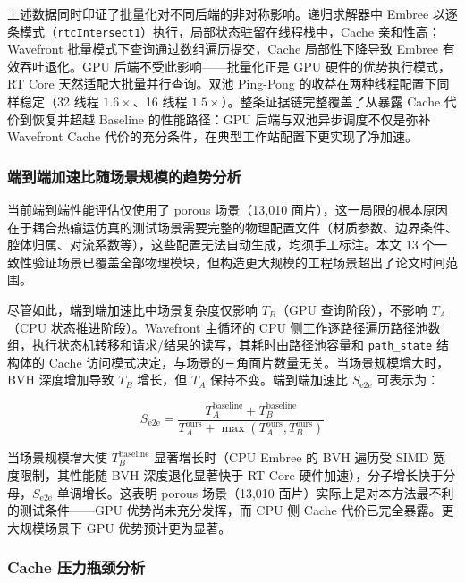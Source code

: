上述数据同时印证了批量化对不同后端的非对称影响。递归求解器中 Embree 以逐条模式（\texttt{rtcIntersect1}）执行，局部状态驻留在线程栈中，Cache 亲和性高；Wavefront 批量模式下查询通过数组遍历提交，Cache 局部性下降导致 Embree 有效吞吐退化。GPU 后端不受此影响——批量化正是 GPU 硬件的优势执行模式，RT Core 天然适配大批量并行查询。双池 Ping-Pong 的收益在两种线程配置下同样稳定（32 线程 $1.6\times$、16 线程 $1.5\times$）。整条证据链完整覆盖了从暴露 Cache 代价到恢复并超越 Baseline 的性能路径：GPU 后端与双池异步调度不仅是弥补 Wavefront Cache 代价的充分条件，在典型工作站配置下更实现了净加速。

\subsubsection{端到端加速比随场景规模的趋势分析}
\label{sec:scene-scale-analysis}

当前端到端性能评估仅使用了 porous 场景（13{,}010 面片），这一局限的根本原因在于耦合热输运仿真的测试场景需要完整的物理配置文件（材质参数、边界条件、腔体归属、对流系数等），这些配置无法自动生成，均须手工标注。本文 13 个一致性验证场景已覆盖全部物理模块，但构造更大规模的工程场景超出了论文时间范围。

尽管如此，端到端加速比中场景复杂度仅影响 $T_B$（GPU 查询阶段），不影响 $T_A$（CPU 状态推进阶段）。Wavefront 主循环的 CPU 侧工作逐路径遍历路径池数组，执行状态机转移和请求/结果的读写，其耗时由路径池容量和 \texttt{path\_state} 结构体的 Cache 访问模式决定，与场景的三角面片数量无关。当场景规模增大时，BVH 深度增加导致 $T_B$ 增长，但 $T_A$ 保持不变。端到端加速比 $S_{\text{e2e}}$ 可表示为：

\begin{equation}
  \label{eq:speedup-trend}
  S_{\text{e2e}} = \frac{T_A^{\text{baseline}} + T_B^{\text{baseline}}}{T_A^{\text{ours}} + \max(T_A^{\text{ours}}, T_B^{\text{ours}})}
\end{equation}

当场景规模增大使 $T_B^{\text{baseline}}$ 显著增长时（CPU Embree 的 BVH 遍历受 SIMD 宽度限制，其性能随 BVH 深度退化显著快于 RT Core 硬件加速），分子增长快于分母，$S_{\text{e2e}}$ 单调增长。这表明 porous 场景（13{,}010 面片）实际上是对本方法最不利的测试条件——GPU 优势尚未充分发挥，而 CPU 侧 Cache 代价已完全暴露。更大规模场景下 GPU 优势预计更为显著。

\subsubsection{Cache 压力瓶颈分析}

